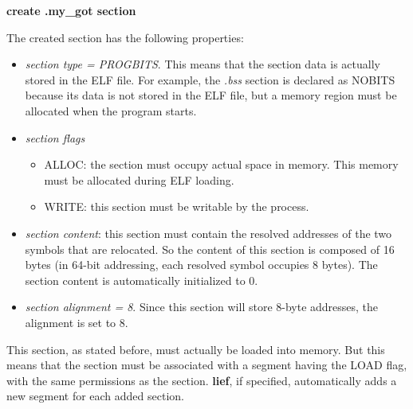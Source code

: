 \begin{center}
\textbf{create .my\_got section}    
\end{center}
The created section has the following properties:
\begin{itemize}
    \item \textit{section type = PROGBITS}. This means that the section data is actually stored in the \gls{ELF} file.
        For example, the \textit{.bss} section is declared as NOBITS because its data is not stored in the \gls{ELF} file, but a
        memory region must be allocated when the program starts.
    \item \textit{section flags} \begin{itemize}
        \item ALLOC: the section must occupy actual space in memory. This memory must be allocated during \gls{ELF} loading.
        \item WRITE: this section must be writable by the process.
    \end{itemize}
    \item \textit{section content}: this section must contain the resolved addresses of the two symbols that are relocated.
        So the content of this section is composed of 16 bytes (in 64-bit addressing, each resolved symbol occupies 8 bytes).
        The section content is automatically initialized to 0.
    \item \textit{section alignment = 8}. Since this section will store 8-byte addresses, the alignment is set to 8.
\end{itemize}
This section, as stated before, must actually be loaded into memory. But this means that the section must be associated with a segment
having the LOAD flag, with the same permissions as the section.
\textbf{lief}, if specified, automatically adds a new segment for each added section.

